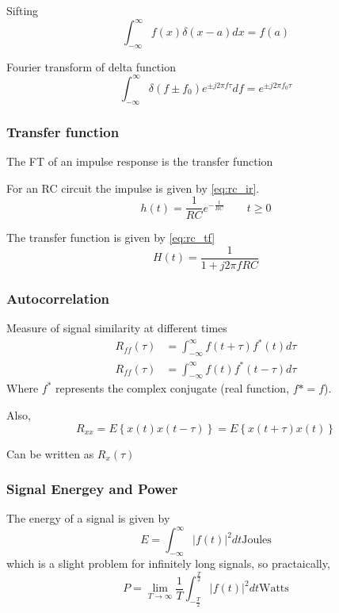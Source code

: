 \documentclass[a4paper]{article}
\newcommand{\infint}{ \int_{-\infty}^{\infty}}
\begin{document}
				Sifting
				\begin{equation}
					\infint f(x) \delta(x-a)dx =f(a)
				\end{equation}

				Fourier transform of delta function
				\begin{equation}
					\infint \delta (f \pm f_0) e^{\pm j 2 \pi f \tau} df = e^{\pm j 2 \pi f_0 \tau}
				\end{equation}

			\subsubsection{Transfer function}
				The FT of an impulse response is the transfer function

				For an RC circuit the impulse  is given by \cref{eq:rc_ir}.
				\begin{equation}
					h(t) = \frac{1}{RC}e^{-\frac{t}{RC}} \qquad t\ge 0 \label{eq:rc_ir}
				\end{equation}

				The transfer function is given by \cref{eq:rc_tf}
				\begin{equation}
					H(t) = \frac{1}{1+j2\pi f RC}\label{eq:rc_tf}
				\end{equation}
			\subsubsection{Autocorrelation}
				Measure of signal similarity at different times
				\begin{align}
					R_{ff}(\tau) &= \infint f(t+\tau)f^\ast(t) d\tau \\
					R_{ff}(\tau) &= \infint f(t)f^\ast(t-\tau) d\tau
				\end{align}
				Where $f^\ast$ represents the complex conjugate (real function, $f\ast = f$).

				Also,
				\begin{equation}
					R_{xx} = E \left\{ x(t)x(t-\tau) \right\}=E \left\{x(t+\tau)x(t)\right\}
				\end{equation}

				Can be written as $R_x(\tau)$
			\subsubsection{Signal Energey and Power}
				The energy of a signal is given by
				\begin{equation}
					E = \infint \left| f(t)\right|^2 dt \mathrm{Joules}
				\end{equation}
				which is a slight problem for infinitely long signals, so practaically,
				\begin{equation}
					P =\lim_{T \to \infty} \frac{1}{T} \int^{\frac{T}{2}}_{-\frac{T}{2}} \left| f(t)\right|^2 dt \mathrm{Watts}
				\end{equation}
\end{document}
